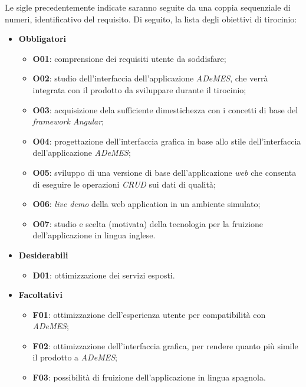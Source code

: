 Le sigle precedentemente indicate saranno seguite da una coppia sequenziale di numeri, identificativo del requisito.
Di seguito, la lista degli obiettivi di tirocinio:
\begin{itemize}
    \item \textbf{Obbligatori}
        \begin{itemize}
            \item \textbf{O01}: comprensione dei requisiti utente da soddisfare;
            \item \textbf{O02}: studio dell'interfaccia dell'applicazione \textit{ADeMES}, che verrà integrata con il prodotto da sviluppare durante il tirocinio;
            \item \textbf{O03}: acquisizione dela sufficiente dimestichezza con i concetti di base del \textit{framework Angular};
            \item \textbf{O04}: progettazione dell'interfaccia grafica in base allo stile dell'interfaccia dell'applicazione \textit{ADeMES};
            \item \textbf{O05}: sviluppo di una versione di base dell'applicazione \textit{web} che consenta di eseguire le operazioni \textit{CRUD} sui dati di qualità;  
            \item \textbf{O06}: \textit{live demo} della web application in un ambiente simulato;
            \item \textbf{O07}: studio e scelta (motivata) della tecnologia per la fruizione dell'applicazione in lingua inglese.
        \end{itemize}
    \item \textbf{Desiderabili}
        \begin{itemize}
            \item \textbf{D01}: ottimizzazione dei servizi  esposti.
        \end{itemize}
    \item \textbf{Facoltativi}
        \begin{itemize}
            \item \textbf{F01}: ottimizzazione dell'esperienza utente per compatibilità con \textit{ADeMES};
            \item \textbf{F02}: ottimizzazione dell'interfaccia grafica, per rendere quanto più simile il prodotto a \textit{ADeMES};
            \item \textbf{F03}: possibilità di fruizione dell'applicazione in lingua spagnola.
        \end{itemize}
\end{itemize}



